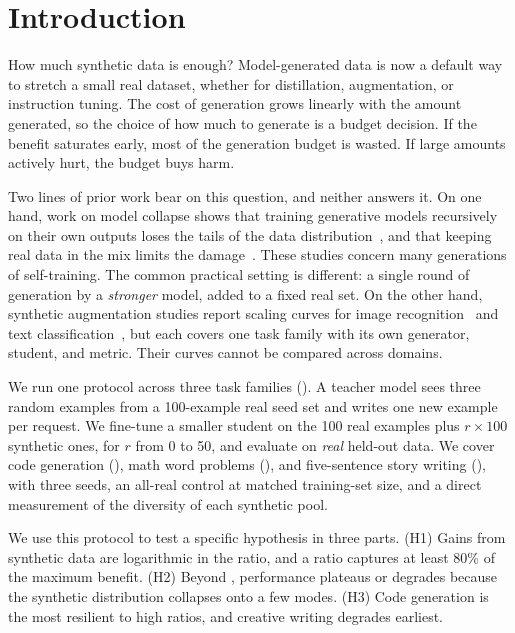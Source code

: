 \section{Introduction}
\label{sec:intro}

How much synthetic data is enough?
Model-generated data is now a default way to stretch a small real dataset, whether for distillation, augmentation, or instruction tuning.
The cost of generation grows linearly with the amount generated, so the choice of how much to generate is a budget decision.
If the benefit saturates early, most of the generation budget is wasted.
If large amounts actively hurt, the budget buys harm.

Two lines of prior work bear on this question, and neither answers it.
On one hand, work on model collapse shows that training generative models recursively on their own outputs loses the tails of the data distribution~\citep{shumailov2023curse,shumailov2024collapse,alemohammad2024mad,dohmatob2024tale}, and that keeping real data in the mix limits the damage~\citep{gerstgrasser2024inevitable,bertrand2024stability}.
These studies concern many generations of self-training.
The common practical setting is different: a single round of generation by a \emph{stronger} model, added to a fixed real set.
On the other hand, synthetic augmentation studies report scaling curves for image recognition~\citep{he2023synthetic,azizi2023synthetic,fan2024scaling} and text classification~\citep{ye2022zerogen,yu2023attributed,li2023synthetic}, but each covers one task family with its own generator, student, and metric.
Their curves cannot be compared across domains.

We run one protocol across three task families ().
A teacher model sees three random examples from a 100-example real seed set and writes one new example per request.
We fine-tune a smaller student on the 100 real examples plus $r \times 100$ synthetic ones, for $r$ from 0 to 50, and evaluate on \emph{real} held-out data.
We cover code generation (\mbpp), math word problems (\gsm), and five-sentence story writing (\roc), with three seeds, an all-real control at matched training-set size, and a direct measurement of the diversity of each synthetic pool.

We use this protocol to test a specific hypothesis in three parts.
(H1) Gains from synthetic data are logarithmic in the ratio, and a  ratio captures at least 80\% of the maximum benefit.
(H2) Beyond , performance plateaus or degrades because the synthetic distribution collapses onto a few modes.
(H3) Code generation is the most resilient to high ratios, and creative writing degrades earliest.

